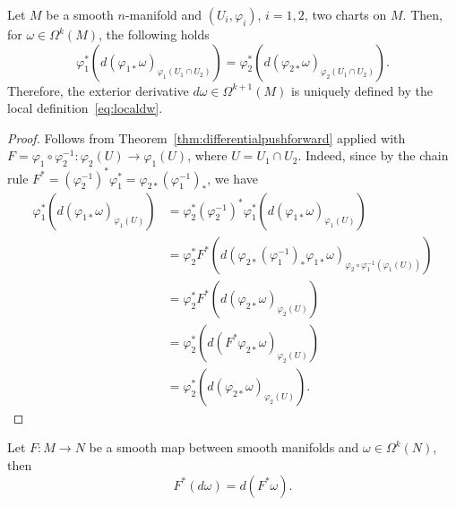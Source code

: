 \begin{corollary}
	Let $M$ be a smooth $n$-manifold and $(U_i, \varphi_i)$, $i=1,2$, two charts on $M$.
	Then, for $\omega\in\Omega^k(M)$, the following holds
	\begin{equation}
		\varphi_1^*\left(d(\varphi_{1*}\omega)_{\varphi_1(U_1\cap U_2)}\right) =
		\varphi_2^*\left(d(\varphi_{2*}\omega)_{\varphi_2(U_1\cap U_2)}\right).
	\end{equation}
	Therefore, the exterior derivative $d\omega\in\Omega^{k+1}(M)$ is uniquely defined by the local definition~\eqref{eq:localdw}.
\end{corollary}
\begin{proof}
	Follows from Theorem~\ref{thm:differentialpushforward} applied with $F = \varphi_1\circ\varphi_2^{-1} : \varphi_2(U) \to \varphi_1(U)$, where $U=U_1\cap U_2$.
	Indeed, since by the chain rule $F^* = (\varphi_2^{-1})^*\varphi_1^* = \varphi_{2*}(\varphi_1^{-1})_*$, we have
	\begin{align}
		\varphi_1^*\left(d(\varphi_{1*}\omega)_{\varphi_1(U)}\right)
		 & = \varphi_2^* (\varphi_2^{-1})^* \varphi_1^*\left(d(\varphi_{1*}\omega)_{\varphi_1(U)}\right) \\
		 & = \varphi_2^* F^*\left(d(\varphi_{2*}(\varphi_{1}^{-1})_*\varphi_{1*}\omega)_{\varphi_2\circ\varphi_1^{-1}(\varphi_1(U))}\right) \\
		 & = \varphi_2^* F^*\left(d(\varphi_{2*}\omega)_{\varphi_2(U)}\right)                            \\
		 & = \varphi_2^* \left(d(F^*\varphi_{2*}\omega)_{\varphi_2(U)}\right)                            \\
		 & = \varphi_2^* \left(d(\varphi_{2*}\omega)_{\varphi_2(U)}\right).
	\end{align}
\end{proof}

\begin{exercise}\label{ex:smoothpushforward}
	Let $F:M\to N$ be a smooth map between smooth manifolds and $\omega\in\Omega^k(N)$, then
	\begin{equation}
		F^* (d\omega) = d(F^* \omega).
	\end{equation}
\end{exercise}

